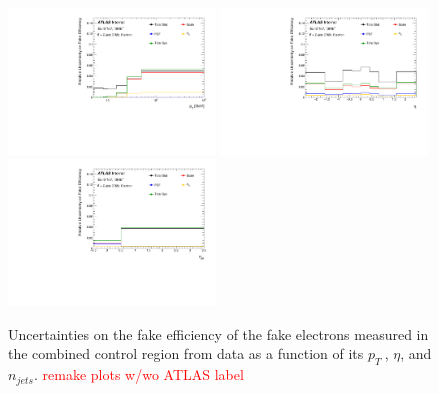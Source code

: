 \begin{figure}[htb]
        \begin{center}
        \includegraphics[width = 0.49\textwidth]{figures/Analysis/Background/SystematicUncertainties3D_Electron_pT.pdf}
        \includegraphics[width = 0.49\textwidth]{figures/Analysis/Background/SystematicUncertainties3D_Electron_eta.pdf}\\
        \includegraphics[width = 0.49\textwidth]{figures/Analysis/Background/SystematicUncertainties3D_Electron_njet.pdf} 
        \end{center}
    \caption{Uncertainties on the fake efficiency of the fake electrons measured in the combined control region from data as a function of its $p_{T}~$, $\eta$, and $n_{jets}$. \textcolor{red}{remake plots w/wo ATLAS label} \label{fig:FakeEffUnc_3D_Electron}}
\end{figure}

